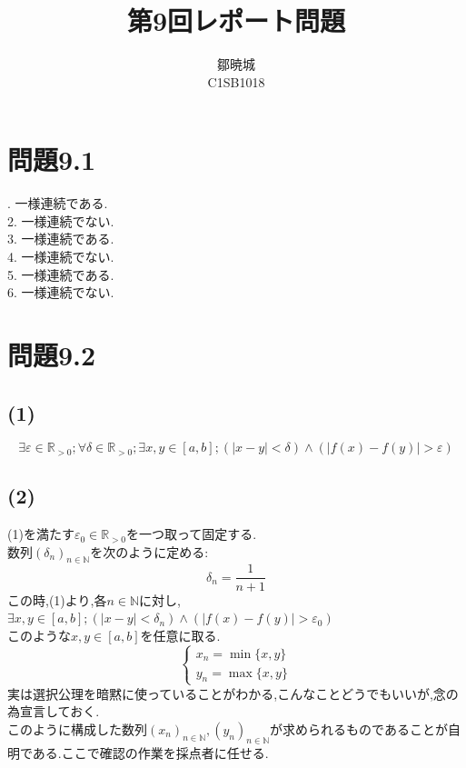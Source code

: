 \documentclass{jreport}
\begin{document}
\title{第9回レポート問題}
\author{鄒暁城 \\ C1SB1018}
\maketitle
\newpage
\tableofcontents
{}
\newpage
\setcounter{chapter}{9}
\section{問題9.1}
. 一様連続である.\\
2. 一様連続でない.\\
3. 一様連続である.\\
4. 一様連続でない.\\
5. 一様連続である.\\
6. 一様連続でない.\\
\section{問題9.2}
\subsection{(1)}
$$
\exists \varepsilon \in \mathbb{R}_{>0};\forall \delta \in \mathbb{R}_{>0}; \exists x,y \in [a,b]; (|x-y|<\delta) \land (|f(x) -f(y)|>\varepsilon)
$$
\subsection{(2)}
(1)を満たす$\varepsilon_0 \in \mathbb{R}_{>0}$を一つ取って固定する.\\
数列$(\delta_n)_{n \in \mathbb{N}}$を次のように定める:\\
$$
\delta_n = \frac{1}{n+1}
$$
この時,(1)より,各$n \in \mathbb{N}$に対し,\\
$\exists x,y \in [a,b]; (|x-y|<\delta_n) \land (|f(x) -f(y)|>\varepsilon_0)$\\このような$x,y \in [a,b]$を任意に取る.\\
\begin{equation}
	\begin{cases}
		x_n =\min \{x,y\} \\
		y_n =\max \{x,y\}
	\end{cases}
\end{equation}
実は選択公理を暗黙に使っていることがわかる,こんなことどうでもいいが,念の為宣言しておく.\\
このように構成した数列$(x_n)_{n\in \mathbb{N}},(y_n)_{n \in \mathbb{N}}$が求められるものであることが自明である.ここで確認の作業を採点者に任せる.\\
\end{document}
